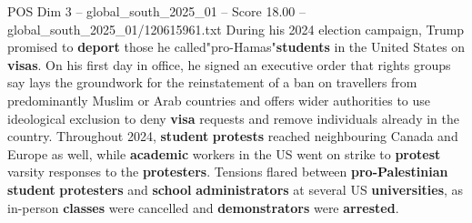 \begin{textsample}{POS Dim 3 – global\_south\_2025\_01 – Score 18.00 – global\_south\_2025\_01/120615961.txt}
During his 2024 election campaign, Trump promised to \textbf{deport} those he called"pro-Hamas"\textbf{students} in the United States on \textbf{visas}.
On his first day in office, he signed an executive order that rights groups say lays the groundwork for the reinstatement of a ban on travellers from predominantly Muslim or Arab countries and offers wider authorities to use ideological exclusion to deny \textbf{visa} requests and remove individuals already in the country.
Throughout 2024, \textbf{student} \textbf{protests} reached neighbouring Canada and Europe as well, while \textbf{academic} workers in the US went on strike to \textbf{protest} varsity responses to the \textbf{protesters}.
Tensions flared between \textbf{pro-Palestinian} \textbf{student} \textbf{protesters} and \textbf{school} \textbf{administrators} at several US \textbf{universities}, as in-person \textbf{classes} were cancelled and \textbf{demonstrators} were \textbf{arrested}.

\end{textsample}
